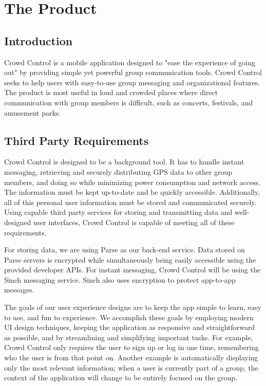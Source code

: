 


\renewcommand{\familydefault}{\sfdefault}
\renewcommand{\arraystretch}{1.5}

\chapter{The Product}

\section{Introduction}

Crowd Control is a mobile application designed to "ease the experience of going out" by providing
simple yet powerful group communication tools. Crowd Control seeks to help users with easy-to-use
group messaging and organizational features. The product is most useful in loud and crowded places
where direct communication with group members is difficult, such as concerts, festivals, and
amusement parks.



\section{Third Party Requirements}

Crowd Control is designed to be a background tool. It has to handle instant messaging, retrieving and
securely distributing GPS data to other group members, and doing so while minimizing power
consumption and network access. The information must be kept up-to-date and be quickly accessible.
Additionally, all of this personal user information must be stored and communicated securely. Using
capable third party services for storing and transmitting data and well-designed user interfaces, Crowd
Control is capable of meeting all of these requirements.

For storing data, we are using Parse as our back-end service. Data stored on Parse servers is
encrypted while simultaneously being easily accessible using the provided developer APIs. For instant
messaging, Crowd Control will be using the Sinch messaging service. Sinch also uses encryption to
protect app-to-app messages.

The goals of our user experience designs are to keep the app simple to learn, easy to use, and fun to
experience. We accomplish these goals by employing modern UI design techniques, keeping the
application as responsive and straightforward as possible, and by streamlining and simplifying
important tasks. For example, Crowd Control only requires the user to sign up or log in one time,
remembering who the user is from that point on. Another example is automatically displaying only the
most relevant information; when a user is currently part of a group, the context of the application will
change to be entirely focused on the group.\\

